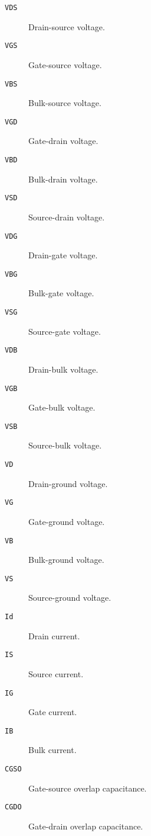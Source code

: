 \begin{description}

\item[{\tt VDS}] Drain-source voltage.

\item[{\tt VGS}] Gate-source voltage.

\item[{\tt VBS}] Bulk-source voltage.

\item[{\tt VGD}] Gate-drain voltage.

\item[{\tt VBD}] Bulk-drain voltage.

\item[{\tt VSD}] Source-drain voltage.

\item[{\tt VDG}] Drain-gate voltage.

\item[{\tt VBG}] Bulk-gate voltage.

\item[{\tt VSG}] Source-gate voltage.

\item[{\tt VDB}] Drain-bulk voltage.

\item[{\tt VGB}] Gate-bulk voltage.

\item[{\tt VSB}] Source-bulk voltage.

\item[{\tt VD}] Drain-ground voltage.

\item[{\tt VG}] Gate-ground voltage.

\item[{\tt VB}] Bulk-ground voltage.

\item[{\tt VS}] Source-ground voltage.

\item[{\tt Id}] Drain current.

\item[{\tt IS}] Source current.

\item[{\tt IG}] Gate current.

\item[{\tt IB}] Bulk current.

\item[{\tt CGSO}] Gate-source overlap capacitance.

\item[{\tt CGDO}] Gate-drain overlap capacitance.


\end{description}
